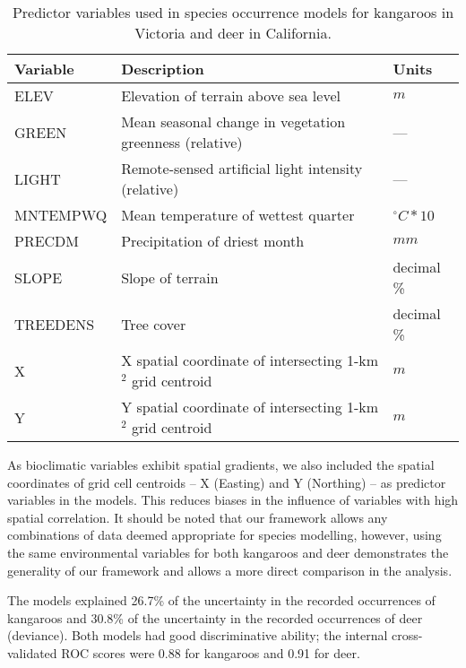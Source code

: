 \begin{table}[!h]
\caption[Predictor variables used in species occurrence models for kangaroos and deer]{Predictor variables used in species occurrence models for kangaroos in Victoria and deer in California.}
\centering
\begin{tabularx}{0.9\textwidth}{@{}lll@{}} \toprule
Variable 	&Description 												&Units \\ \midrule 
ELEV 		&Elevation of terrain above sea level 						&$m$\\
GREEN 		&Mean seasonal change in vegetation greenness (relative) 	&---\\
LIGHT 		&Remote-sensed artificial light intensity (relative) 		&---\\ 
MNTEMPWQ 	&Mean temperature of wettest quarter 						&$^{\circ}C*10$\\
PRECDM 		&Precipitation of driest month 								&$mm$\\
SLOPE 		&Slope of terrain 											&decimal \%\\ 
TREEDENS 	&Tree cover 												&decimal \%\\ 
X 			&X spatial coordinate of intersecting 1-km$^2$ grid centroid &$m$\\
Y 			&Y spatial coordinate of intersecting 1-km$^2$ grid centroid &$m$\\
\bottomrule
\end{tabularx}
\label{cal_vic_vars}
\end{table}

As bioclimatic variables exhibit spatial gradients, we also included the spatial coordinates of grid cell centroids -- X (Easting) and Y (Northing) -- as predictor variables in the models.  This reduces biases in the influence of variables with high spatial correlation.  It should be noted that our framework allows any combinations of data deemed appropriate for species modelling, however, using the same environmental variables for both kangaroos and deer demonstrates the generality of our framework and allows a more direct comparison in the analysis.

The models explained 26.7\% of the uncertainty in the recorded occurrences of kangaroos and 30.8\% of the uncertainty in the recorded occurrences of deer (deviance). Both models had good discriminative ability; the internal cross-validated ROC scores were 0.88 for kangaroos and 0.91 for deer.

